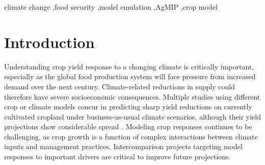 \documentclass[preprint, 5p, times, twocolumn]{elsarticle}
\begin{document}
\begin{frontmatter}
\begin{abstract}


\end{abstract}
\begin{keyword}
climate change \sep food security \sep model emulation \sep AgMIP \sep crop model
\end{keyword}
\end{frontmatter}
\modulolinenumbers[1]
\linenumbers
\section{Introduction}
\label{S:1}
Understanding crop yield response to a changing climate is critically important, especially as the global food production system will face pressure from increased demand over the next century. Climate-related reductions in supply could therefore have severe socioeconomic consequences. Multiple studies using different crop or climate models concur in predicting sharp yield reductions on currently cultivated cropland under {business-as-usual} climate scenarios, although their yield projections show considerable spread \citep[e.g.][and references therein]{porter2014, Rosenzweig2014, Schauberger2017}. Modeling crop responses continues to be challenging, as crop growth is a function of complex interactions between climate inputs and management practices. Intercomparison projects targeting model responses to important drivers are critical to improve future projections.
\end{document}
